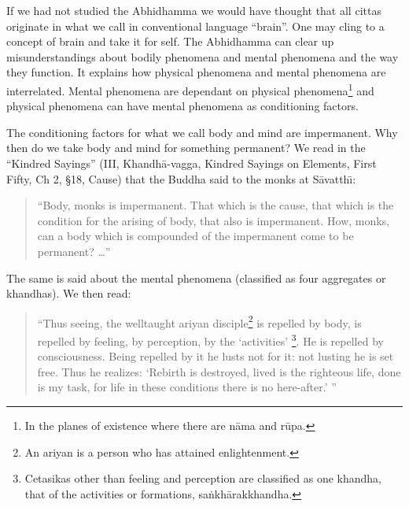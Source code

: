\documentclass{book}
\begin{document}
If we had not studied the Abhidhamma we would have thought that all
cittas originate in what we call in conventional language ``brain''.
One may cling to a concept of brain and take it for self. The
Abhidhamma can clear up misunderstandings about bodily phenomena and
mental phenomena and the way they function. It explains how physical
phenomena and mental phenomena are interrelated. Mental phenomena are
dependant on physical phenomena\footnote{In the
planes of existence where there are n{\=a}ma and r\=upa. } and
physical phenomena can have mental phenomena as conditioning factors.

The conditioning factors for what we call body and mind are impermanent.
Why then do we take body and mind for something permanent? We read in
the ``Kindred Sayings'' (III, Khandh{\=a}-vagga, Kindred Sayings on
Elements, First Fifty, Ch 2, {\S}18, Cause) that the Buddha said to
the monks at S{\=a}vatth\=\i:




\begin{quote}\begin{flushleft}
``Body, monks is impermanent. That which is the cause, that which is the
condition for the arising of body, that also is impermanent. How,
monks, can a body which is compounded of the impermanent come to be
permanent? \ldots''
\end{flushleft}\end{quote}




The same is said about the mental phenomena (classified as four
aggregates or khandhas). We then read:




\begin{quote}\begin{flushleft}
``Thus seeing, the welltaught ariyan disciple\footnote{An ariyan is a
person who has attained enlightenment.} is repelled by body, is
repelled by feeling, by perception, by the `activities'
\footnote{Cetasikas other than feeling and perception are classified
as one khandha, that of the activities or formations,
sa\.nkh{\=a}rakkhandha.}. He is repelled by consciousness. Being
repelled by it he lusts not for it: not lusting he is set free. Thus he
realizes: `Rebirth is destroyed, lived is the righteous life, done is
my task, for life in these conditions there is no here-after.' ''
\end{flushleft}\end{quote}
\end{document}
